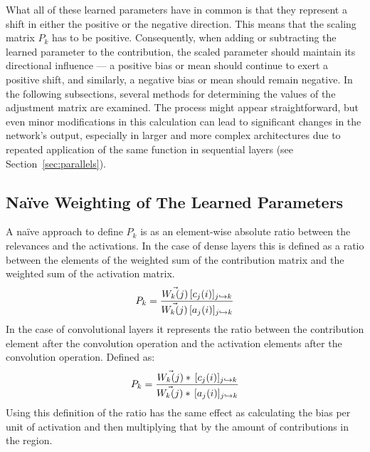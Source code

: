 What all of these learned parameters have in common is that they represent a shift in either the positive or the negative direction. This means that the scaling matrix $P_{k}$ has to be positive. Consequently, when adding or subtracting the learned parameter to the contribution, the scaled parameter should maintain its directional influence --- a positive bias or mean should continue to exert a positive shift, and similarly, a negative bias or mean should remain negative. In the following subsections, several methods for determining the values of the adjustment matrix are examined. The process might appear straightforward, but even minor modifications in this calculation can lead to significant changes in the network's output, especially in larger and more complex architectures due to repeated application of the same function in sequential layers (see Section~\ref{sec:parallels}).

\subsection{Naïve Weighting of The Learned Parameters}
\label{naive}

A naïve approach to define $P_{k}$ is as an element-wise absolute ratio between the relevances and the activations. In the case of dense layers this is defined as a ratio between the elements of the weighted sum of the contribution matrix and the weighted sum of the activation matrix.
\begin{equation*}
    P_{k} = \dfrac{\vec{W_k(j)}\,[c_j(i)]_{j\hookrightarrow k}}{\vec{W_k(j)}\,[a_j(i)]_{j\hookrightarrow k}}
\end{equation*}
In the case of convolutional layers it represents the ratio between the contribution element after the convolution operation and the activation elements after the convolution operation. Defined as:
\begin{equation*}
    P_{k} = \dfrac{\vec{W_k(j)}\ast\,[c_j(i)]_{j\hookrightarrow k}}{\vec{W_k(j)} \ast \,[a_j(i)]_{j\hookrightarrow k}}
\end{equation*}
Using this definition of the ratio has the same effect as calculating the bias per unit of activation and then multiplying that by the amount of contributions in the region.

